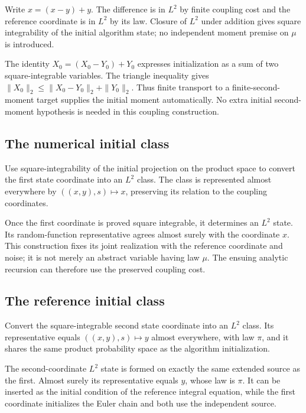 \documentclass[11pt,a4paper]{report}
\begin{document}
Write \(x=(x-y)+y\). The difference is in \(L^2\) by finite coupling cost and the reference coordinate is in \(L^2\) by its law. Closure of \(L^2\) under addition gives square integrability of the initial algorithm state; no independent moment premise on \(\mu\) is introduced.



The identity \(X_0=(X_0-Y_0)+Y_0\) expresses initialization as a sum of two square-integrable variables. The triangle inequality gives \(\|X_0\|_2\le\|X_0-Y_0\|_2+\|Y_0\|_2\). Thus finite transport to a finite-second-moment target supplies the initial moment automatically. No extra initial second-moment hypothesis is needed in this coupling construction.

\subsection{\texorpdfstring{The numerical initial class}{The numerical initial class}}
\label{report-step-UnadjustedLangevin-InitialExtension-lean-19}


Use square-integrability of the initial projection on the product space to convert the first state coordinate into an \(L^2\) class. The class is represented almost everywhere by \(((x,y),s)\mapsto x\), preserving its relation to the coupling coordinates.



Once the first coordinate is proved square integrable, it determines an \(L^2\) state. Its random-function representative agrees almost surely with the coordinate \(x\). This construction fixes its joint realization with the reference coordinate and noise; it is not merely an abstract variable having law \(\mu\). The ensuing analytic recursion can therefore use the preserved coupling cost.

\subsection{\texorpdfstring{The reference initial class}{The reference initial class}}
\label{report-step-UnadjustedLangevin-InitialExtension-lean-20}


Convert the square-integrable second state coordinate into an \(L^2\) class. Its representative equals \(((x,y),s)\mapsto y\) almost everywhere, with law \(\pi\), and it shares the same product probability space as the algorithm initialization.



The second-coordinate \(L^2\) state is formed on exactly the same extended source as the first. Almost surely its representative equals \(y\), whose law is \(\pi\). It can be inserted as the initial condition of the reference integral equation, while the first coordinate initializes the Euler chain and both use the independent source.
\end{document}
